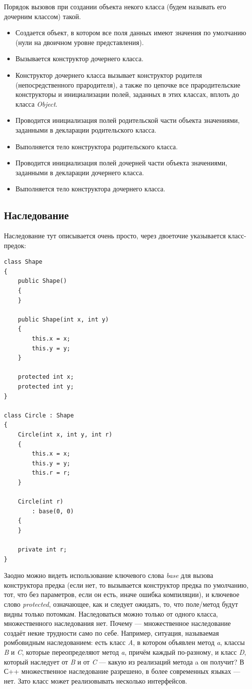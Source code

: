 \documentclass[a5paper]{article}
\begin{document}
Порядок вызовов при создании объекта некого класса (будем называть его дочерним классом) такой.
\begin{itemize}
	\item Создается объект, в котором все поля данных имеют значения по умолчанию (нули на двоичном уровне представления).
	\item Вызывается конструктор дочернего класса.
	\item Конструктор дочернего класса вызывает конструктор родителя (непосредственного прародителя), а также по цепочке все прародительские конструкторы и инициализации полей, заданных в этих классах, вплоть до класса \textit{Object}.
	\item Проводится инициализация полей родительской части объекта значениями, заданными в декларации родительского класса.
	\item Выполняется тело конструктора родительского класса.
	\item Проводится инициализация полей дочерней части объекта значениями, заданными в декларации дочернего класса.
	\item Выполняется тело конструктора дочернего класса.
\end{itemize}

\subsection{Наследование}

Наследование тут описывается очень просто, через двоеточие указывается класс-предок:

\begin{verbatim}
class Shape
{
    public Shape() 
    {
    }

    public Shape(int x, int y)
    {
        this.x = x;
        this.y = y;
    }

    protected int x;
    protected int y;
}

class Circle : Shape
{
    Circle(int x, int y, int r)
    {
        this.x = x;
        this.y = y;
        this.r = r;
    }

    Circle(int r)
        : base(0, 0)
    {
    }

    private int r;
}
\end{verbatim}

Заодно можно видеть использование ключевого слова \textit{base} для вызова конструктора предка (если нет, то вызывается конструктор предка по умолчанию, тот, что без параметров, если он есть, иначе ошибка компиляции), и ключевое слово \textit{protected}, означающее, как и следует ожидать, то, что поле/метод будут видны только потомкам. Наследоваться можно только от одного класса, множественного наследования нет. Почему --- множественное наследование создаёт некие трудности само по себе. Например, ситуация, называемая ромбовидным наследованием: есть класс \textit{A}, в котором объявлен метод \textit{a}, классы \textit{B} и \textit{C}, которые переопределяют метод \textit{a}, причём каждый по-разному, и класс \textit{D}, который наследует от \textit{B} и от \textit{C} --- какую из реализаций метода a он получит? В С++ множественное наследование разрешено, в более современных языках --- нет. Зато класс может реализовывать несколько интерфейсов.
\end{document}
